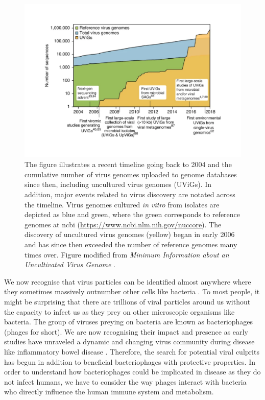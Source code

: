 \begin{figure}[H]
  \includegraphics[scale=1, width=1\textwidth]{pictures/mroux2019.pdf}
  \caption[VirusTimeline]{The figure illustrates a recent timeline going back to 2004 and the cumulative number of virus genomes uploaded to genome databases since then, including uncultured virus genomes (UViGs). In addition, major events related to virus discovery are notated across the timeline. Virus genomes cultured \textit{in vitro} from isolates are depicted as blue and green, where the green corresponds to reference genomes at ncbi (\url{https://www.ncbi.nlm.nih.gov/nuccore}). The discovery of uncultured virus genomes (yellow) began in early 2006 and has since then exceeded the number of reference genomes many times over. Figure modified from \textit{Minimum Information about an Uncultivated Virus Genome} \cite{Roux2019-dc}.
  }
  \label{fig:virushistory}
\end{figure}

\noindent
We now recognise that virus particles can be identified almost anywhere where they sometimes massively outnumber other cells like bacteria \cite{Breitbart2018-sj}. To most people, it might be surprising that there are trillions of viral particles around us without the capacity to infect us as they prey on other microscopic organisms like bacteria. The group of viruses preying on bacteria are known as bacteriophages (phages for short). We are now recognising their impact and presence as early studies have unraveled a dynamic and changing virus community during disease like inflammatory bowel disease \cite{Norman2015-eb,Clooney2019-nn}. Therefore, the search for potential viral culprits has begun in addition to beneficial bacteriophages with protective properties. In order to understand how bacteriophages could be implicated in disease as they do not infect humans, we have to consider the way phages interact with bacteria who directly influence the human immune system and metabolism.